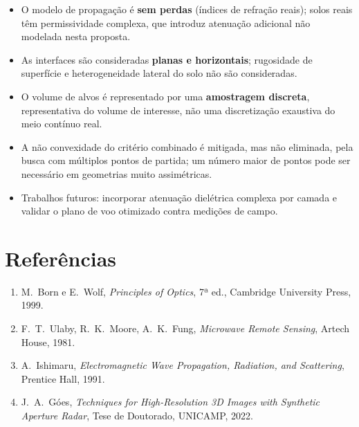 \documentclass[11pt,a4paper]{article}
\begin{document}
\begin{itemize}[nosep]
  \item O modelo de propagação é \textbf{sem perdas} (índices de refração reais); solos reais têm
  permissividade complexa, que introduz atenuação adicional não modelada nesta proposta.
  \item As interfaces são consideradas \textbf{planas e horizontais}; rugosidade de superfície e
  heterogeneidade lateral do solo não são consideradas.
  \item O volume de alvos é representado por uma \textbf{amostragem discreta}, representativa do
  volume de interesse, não uma discretização exaustiva do meio contínuo real.
  \item A não convexidade do critério combinado é mitigada, mas não eliminada, pela busca com
  múltiplos pontos de partida; um número maior de pontos pode ser necessário em geometrias muito
  assimétricas.
  \item Trabalhos futuros: incorporar atenuação dielétrica complexa por camada e validar o plano de
  voo otimizado contra medições de campo.
\end{itemize}

\section*{Referências}

\begin{enumerate}[nosep]
  \item M.\ Born e E.\ Wolf, \emph{Principles of Optics}, 7ª ed., Cambridge University Press, 1999.
  \item F.\ T.\ Ulaby, R.\ K.\ Moore, A.\ K.\ Fung, \emph{Microwave Remote Sensing}, Artech House, 1981.
  \item A.\ Ishimaru, \emph{Electromagnetic Wave Propagation, Radiation, and Scattering}, Prentice Hall, 1991.
  \item J.\ A.\ Góes, \emph{Techniques for High-Resolution 3D Images with Synthetic Aperture Radar}, Tese de Doutorado, UNICAMP, 2022.
\end{enumerate}
\end{document}
